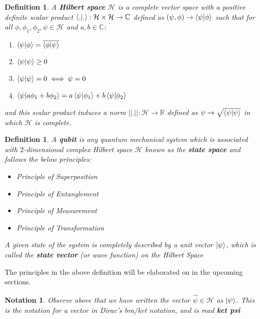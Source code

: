 \documentclass[12pt,twoside]{report}
\theoremstyle{thmstyle}
\newtheorem{defn}[subsection]{Definition}
\newtheorem{notation}[subsection]{Notation}
\begin{document}
\begin{defn}
    A \textbf{Hilbert space} $\mathcal{H}$ is a complete vector space with a positive definite scalar product $\braket{.|.} : \mathcal{H} \times \mathcal{H} \to \mathbb{C}$ defined as $(\psi,\phi) \to \braket{\psi|\phi}$ such that for all $\phi, \phi_1, \phi_2, \psi \in \mathcal{H}$ and $a, b \in \mathbb{C}$:
    \begin{enumerate}
        \item $\braket{\psi | \phi} = \overline{\braket{\phi | \psi}}$
        \item $\braket{\psi | \psi} \geq 0$
        \item $\braket{\psi | \psi} = 0 \iff \psi = 0$
        \item $\braket{\psi | a \phi_1 + b \phi_2} = a \braket{\psi | \phi_1} + b \braket{\psi | \phi_2}$
    \end{enumerate}
    and this scalar product induces a norm $||.|| : \mathcal{H} \to \mathbb{R}$ defined as $\psi \to \sqrt{\braket{\psi|\psi}}$ in which $\mathcal{H}$ is complete.
\end{defn}

\begin{samepage}
\begin{defn}
A \textbf{qubit} is any quantum mechanical system which is associated with $2$-dimensional complex Hilbert space $\mathcal{H}$ known as the \textbf{state space} and follows the below principles:
\begin{itemize}
    \item Principle of Superposition
    \item Principle of Entanglement
    \item Principle of Measurement
    \item Principle of Transformation
\end{itemize}
 A given state of the system is completely described by a
 \textit{unit vector} $\ket{\psi}$, which is called the \textbf{state vector} (or wave function) on the Hilbert Space
\end{defn}

The principles in the above definition will be elaborated on in the upcoming sections.

\end{samepage}

\begin{notation}
    Observe above that we have written the vector $\vec{\psi} \in \mathcal{H}$ as $\ket{\psi}$. This is the notation for a vector in \textnormal{Dirac's bra/ket notation}, and is read \textbf{ket psi}
\end{notation}
\end{document}
